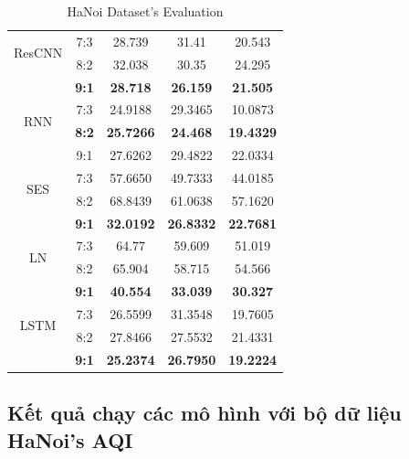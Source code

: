 \documentclass[conference]{IEEEtran}
\begin{document}
\begin{table}[H]
\begin{tabular}{|c|c|c|c|c|}
        \hline
        \multirow{2}{*}{ResCNN}               & 7:3              & 28.739  & 31.41          & 20.543  \\ & 8:2 & 32.038	& 30.35 & 24.295\\ & \textbf{9:1} & \textbf{28.718} & \textbf{26.159} & \textbf{21.505}\\
        \hline
        \multirow{2}{*}{RNN}                  & 7:3              & 24.9188 & 29.3465        & 10.0873 \\ & \textbf{8:2} & \textbf{25.7266} & \textbf{24.468} & \textbf{19.4329} \\ & 9:1 &  27.6262 &	29.4822 & 	22.0334 \\
        \hline
        \multirow{2}{*}{SES}                  & 7:3              & 57.6650 & 49.7333        & 44.0185 \\ & 8:2 & 68.8439 &  61.0638 &  57.1620 \\ & \textbf{9:1} & \textbf{32.0192} & \textbf{26.8332} & \textbf{22.7681}\\
        \hline
        \multirow{2}{*}{LN}                   & 7:3              & 64.77   & 59.609         & 51.019  \\ & 8:2 & 65.904 &  58.715 & 54.566 \\ & \textbf{9:1} & \textbf{40.554} & \textbf{33.039} & \textbf{30.327}\\
        \hline
        \multirow{2}{*}{LSTM}                 & 7:3              & 26.5599 & 31.3548        & 19.7605 \\ & 8:2 & 27.8466 &  27.5532 &  21.4331 \\ & \textbf{9:1} & \textbf{25.2374} & \textbf{26.7950} & \textbf{19.2224}\\
        \hline
    \end{tabular}
    \vspace{5px}
    \caption{HaNoi Dataset's Evaluation}
    \label{mbbresult}
\end{table}


\subsection{Kết quả chạy các mô hình với bộ dữ liệu HaNoi's AQI}
\end{document}
